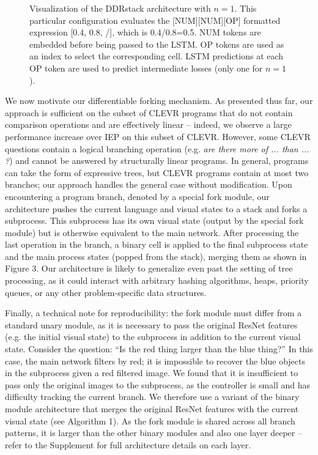 \documentclass{article}
\begin{document}
\begin{figure*}
  \centering
  \vspace{-3.mm}
  \caption{Visualization of the DDRstack architecture with $n=1$. This particular configuration evaluates the [NUM][NUM][OP] formatted expression [0.4, 0.8, /], which is 0.4/0.8=0.5. NUM tokens are embedded before being passed to the LSTM. OP tokens are used as an index to select the corresponding cell. LSTM predictions at each OP token are used to predict intermediate losses (only one for $n=1$).}
  \vspace{-2.mm}
\end{figure*}

We now motivate our differentiable forking mechanism. As presented thus far, our approach is sufficient on the subset of CLEVR programs that do not contain comparison operations and are effectively linear -- indeed, we observe a large performance increase over IEP on this subset of CLEVR. However, some CLEVR questions contain a logical branching operation (e.g. \textit{are there more of ... than ... ?}) and cannot be answered by structurally linear programs. In general, programs can take the form of expressive trees, but CLEVR programs contain at most two branches; our approach handles the general case without modification. Upon encountering a program branch, denoted by a special fork module, our architecture pushes the current language and visual states to a stack and forks a subprocess. This subprocess has its own visual state (output by the special fork module) but is otherwise equivalent to the main network. After processing the last operation in the branch, a binary cell is applied to the final subprocess state and the main process states (popped from the stack), merging them as shown in Figure 3. Our architecture is likely to generalize even past the setting of tree processing, as it could interact with arbitrary hashing algorithms, heaps, priority queues, or any other problem-specific data structures.

Finally, a technical note for reproducibility: the fork module must differ from a standard unary module, as it is necessary to pass the original ResNet features (e.g. the initial visual state) to the subprocess in addition to the current visual state. Consider the question: ``Is the red thing larger than the blue thing?'' In this case, the main network filters by red; it is impossible to recover the blue objects in the subprocess given a red filtered image. We found that it is insufficient to pass only the original images to the subprocess, as the controller is small and has difficulty tracking the current branch. We therefore use a variant of the binary module architecture that merges the original ResNet features with the current visual state (see Algorithm 1). As the fork module is shared across all branch patterns, it is larger than the other binary modules and also one layer deeper -- refer to the Supplement for full architecture details on each layer.
\end{document}
